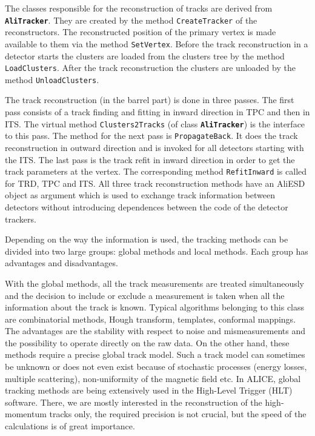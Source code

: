 \documentclass[12pt,a4paper,twoside]{article}
\newcommand{\class}[1]{\texttt{\textbf{#1}}\xspace}
\newcommand{\method}[1]{\texttt{#1}\xspace}
\begin{document}
The classes responsible for the reconstruction of tracks are derived
from \class{AliTracker}. They are created by the method
\method{CreateTracker} of the 
reconstructors. The reconstructed position of the primary vertex is
made available to them via the method \method{SetVertex}. Before the track
reconstruction in a detector starts the clusters are loaded from the
clusters tree by the method \method{LoadClusters}. After the track reconstruction the
clusters are unloaded by the method \method{UnloadClusters}.

The track reconstruction (in the barrel part) is done in three passes. The first
pass consists of a track finding and fitting in inward direction in
TPC and then in ITS. The virtual method \method{Clusters2Tracks} (of
class \class{AliTracker}) is the
interface to this pass. The method for the next pass is
\method{PropagateBack}. It does the track reconstruction in outward direction and is
invoked for all detectors starting with the ITS. The last pass is the
track refit in inward direction in order to get the track parameters
at the vertex. The corresponding method \method{RefitInward} is called for TRD,
TPC and ITS. All three track reconstruction methods have an AliESD object as
argument which is used to exchange track information between detectors
without introducing dependences between the code of the detector
trackers. 

Depending on the way the information is used, the tracking methods can be 
divided into two large groups: global methods and local methods. Each 
group has advantages and disadvantages.

With the global methods, all the track measurements are treated 
simultaneously and the decision to include or exclude a measurement is
taken when all the information about the track is known.
Typical algorithms belonging to this class are combinatorial methods,
Hough transform, templates, conformal mappings.  The advantages are
the stability with respect to noise and mismeasurements and the possibility 
to operate directly on the raw data. On the other hand, these methods
require a precise global track model. Such a track model can sometimes be 
unknown or does not even exist because of stochastic processes (energy
losses, multiple scattering), non-uniformity of the magnetic field etc.
In ALICE, global tracking methods are being extensively used in the
High-Level Trigger (HLT) software. There, we
are mostly interested in the reconstruction of the high-momentum tracks
only, the required precision is not crucial, but the speed of the 
calculations is of great importance.
\end{document}

